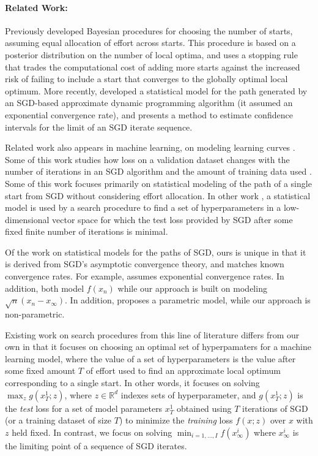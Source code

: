 \documentclass[12pt,english]{article}
\newcommand{\stedit}[1]{{\color{blue} #1}}
\begin{document}
\paragraph{Related Work:}
Previously \cite{boender:1987} developed Bayesian procedures for choosing the number of starts, assuming equal allocation of effort across starts.
This procedure is based on a posterior distribution on the number of local optima, and uses a stopping rule that trades the computational cost of adding more starts against the increased risk of failing to include a start that converges to the globally optimal local optimum. More recently, \cite{frazier2009calibration} developed a statistical model for the path generated by an SGD-based approximate dynamic programming algorithm \stedit{(it assumed an exponential convergence rate)}, and \cite{chen2016} presents a method to estimate confidence intervals for the limit of an SGD iterate sequence.


Related work also appears in machine learning, on modeling learning curves \citep{Swersky:2014,Hutter:2015,klein2016fast,boca2017,li2016}. Some of this work studies how loss on a validation dataset changes with the number of iterations in an SGD algorithm  \citep{Swersky:2014,Hutter:2015} and the amount of training data used  \citep{klein2016fast}. 
Some of this work   \citep{Hutter:2015} focuses primarily on statistical modeling of the path of a single start from SGD without considering effort allocation.  In other work  \citep{Swersky:2014,klein2016fast}, a statistical model is used by a search procedure to find a set of hyperparameters in a low-dimensional vector space for which the test loss provided by SGD after some fixed finite number of iterations is minimal.  



Of the work on statistical models for the paths of SGD, ours is unique in that it is derived from SGD's asymptotic convergence theory, and matches known convergence rates.  For example, \cite{Swersky:2014} assumes exponential convergence rates.
In addition, \cite{Swersky:2014,Hutter:2015} both model $f(x_{n})$ while our approach is built on modeling $\sqrt{n}(x_{n}-x_{\infty})$.  In addition, \cite{Hutter:2015} proposes a parametric model, while our approach is non-parametric.


Existing work on search procedures from this line of literature differs from our own in that it focuses on choosing an optimal set of hyperpamaters for a machine learning model, where the value of a set of hyperparameters is the value after some fixed amount $T$ of effort used to find an approximate local optimum corresponding to a single start.  In other words, it focuses on solving $\max_z g(x^1_T;z)$, where $z\in\mathbb{R}^d$ indexes sets of hyperparameter, and $g(x^1_T;z)$ is the {\it test} loss for a set of model parameters $x^1_T$ obtained using $T$ iterations of SGD (or a training dataset of size $T$) to minimize the {\it training} loss $f(x;z)$ over $x$ with $z$ held fixed.  In contrast, we focus on solving $\min_{i=1,\ldots,I} f(x^i_\infty)$ where $x^i_\infty$ is the limiting point of a sequence of SGD iterates. 
\end{document}
